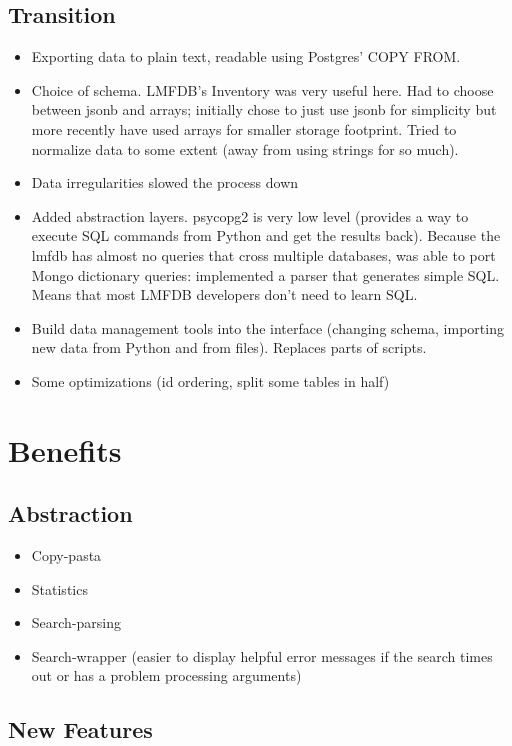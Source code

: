 \documentclass{article}
\begin{document}
\subsection{Transition}

\begin{itemize}
\item Exporting data to plain text, readable using Postgres' COPY FROM.
\item Choice of schema.  LMFDB's Inventory was very useful here.  Had to choose between jsonb and arrays; initially chose to just use jsonb for simplicity but more recently have used arrays for smaller storage footprint.  Tried to normalize data to some extent (away from using strings for so much). 
\item Data irregularities slowed the process down
\item Added abstraction layers.  psycopg2 is very low level (provides a way to execute SQL commands from Python and get the results back).  Because the lmfdb has almost no queries that cross multiple databases, was able to port Mongo dictionary queries: implemented a parser that generates simple SQL.  Means that most LMFDB developers don't need to learn SQL.
\item Build data management tools into the interface (changing schema, importing new data from Python and from files).  Replaces parts of scripts.
\item Some optimizations (id ordering, split some tables in half)
\end{itemize}

\section{Benefits}

\subsection{Abstraction}

\begin{itemize}
\item Copy-pasta
\item Statistics
\item Search-parsing
\item Search-wrapper (easier to display helpful error messages if the search times out or has a problem processing arguments)
\end{itemize}

\subsection{New Features}
\end{document}
